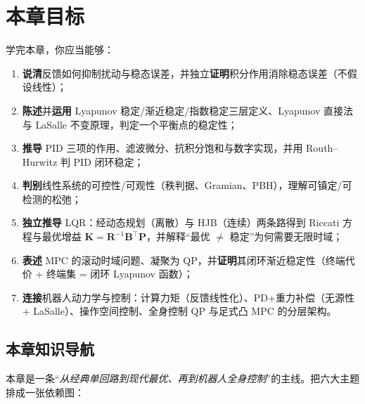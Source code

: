 \section*{本章目标}
学完本章，你应当能够：
\begin{enumerate}
  \item \textbf{说清}反馈如何抑制扰动与稳态误差，并独立\textbf{证明}积分作用消除稳态误差（不假设线性）；
  \item \textbf{陈述}并\textbf{运用} Lyapunov 稳定/渐近稳定/指数稳定三层定义、Lyapunov 直接法与 LaSalle 不变原理，判定一个平衡点的稳定性；
  \item \textbf{推导} PID 三项的作用、滤波微分、抗积分饱和与数字实现，并用 Routh--Hurwitz 判 PID 闭环稳定；
  \item \textbf{判别}线性系统的可控性/可观性（秩判据、Gramian、PBH），理解可镇定/可检测的松弛；
  \item \textbf{独立推导} LQR：经动态规划（离散）与 HJB（连续）两条路得到 Riccati 方程与最优增益 $\mathbf{K}=\mathbf{R}^{-1}\mathbf{B}^\top\mathbf{P}$，并解释“最优 $\ne$ 稳定”为何需要无限时域；
  \item \textbf{表述} MPC 的滚动时域问题、凝聚为 QP，并\textbf{证明}其闭环渐近稳定性（终端代价 + 终端集 = 闭环 Lyapunov 函数）；
  \item \textbf{连接}机器人动力学与控制：计算力矩（反馈线性化）、PD+重力补偿（无源性 + LaSalle）、操作空间控制、全身控制 QP 与足式凸 MPC 的分层架构。
\end{enumerate}

\subsection*{本章知识导航}
本章是一条“\emph{从经典单回路到现代最优、再到机器人全身控制}”的主线。把六大主题排成一张依赖图：

